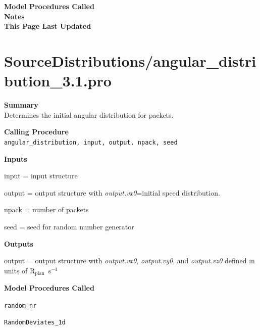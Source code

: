 \documentclass[11pt]{article}
\newcommand\descrip[1]{\textsf{\textbf{\large{#1}}}\\}
\newcommand\Rplan{R$_{\mathrm{plan}}$}
\begin{document}
\descrip{Model Procedures Called}

\descrip{Notes}

\descrip{This Page Last Updated}

\clearpage

\section{SourceDistributions/angular\_distribution\_3.1.pro}
\label{sec:angulardistribution}

\descrip{Summary}
Determines the initial angular distribution for packets.

\descrip{Calling Procedure}
\verb+angular_distribution, input, output, npack, seed+

\descrip{Inputs}
\begin{compactenum} \listup
\item input = input structure
\item output = output structure with \textit{output.vx0}=initial speed distribution.
\item npack = number of packets
\item seed = seed for random number generator
\end{compactenum} 

\descrip{Outputs}
\begin{compactenum} \listup
\item output = output structure with \textit{output.vx0}, \textit{output.vy0}, and
\textit{output.vz0} defined in units of \Rplan\ s$^{-1}$
\end{compactenum} 

\descrip{Model Procedures Called}
\begin{compactenum} \listup
\item \texttt{random\_nr}
\item \texttt{RandomDeviates\_1d}
\end{compactenum}
\end{document}
